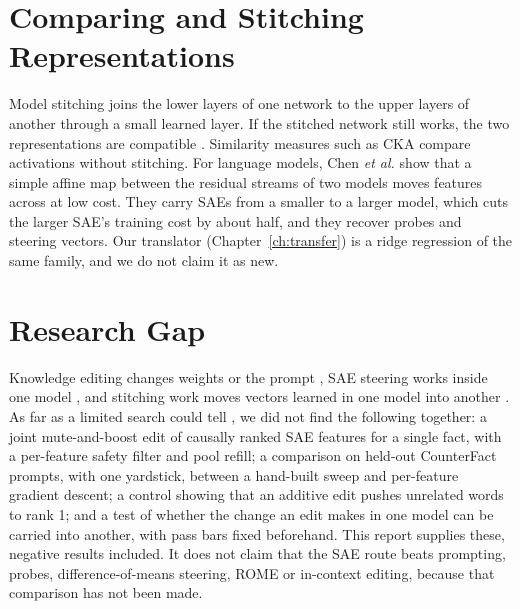 \section{Comparing and Stitching Representations}

Model stitching joins the lower layers of one network to the upper layers of another through a small learned layer. If the stitched network still works, the two representations are compatible \cite{r41,r42}. Similarity measures such as CKA \cite{r43} compare activations without stitching. For language models, Chen \textit{et al.} \cite{r44} show that a simple affine map between the residual streams of two models moves features across at low cost. They carry SAEs from a smaller to a larger model, which cuts the larger SAE's training cost by about half, and they recover probes and steering vectors. Our translator (Chapter~\ref{ch:transfer}) is a ridge regression \cite{r45} of the same family, and we do not claim it as new.

\section{Research Gap}

Knowledge editing changes weights or the prompt \cite{r2,r3,r31}, SAE steering works inside one model \cite{r23,r28,r29}, and stitching work moves vectors learned in one model into another \cite{r44}. As far as a limited search could tell \cite{p11}, we did not find the following together: a joint mute-and-boost edit of causally ranked SAE features for a single fact, with a per-feature safety filter and pool refill; a comparison on held-out CounterFact prompts, with one yardstick, between a hand-built sweep and per-feature gradient descent; a control showing that an additive edit pushes unrelated words to rank 1; and a test of whether the change an edit makes in one model can be carried into another, with pass bars fixed beforehand. This report supplies these, negative results included. It does not claim that the SAE route beats prompting, probes, difference-of-means steering, ROME or in-context editing, because that comparison has not been made.
